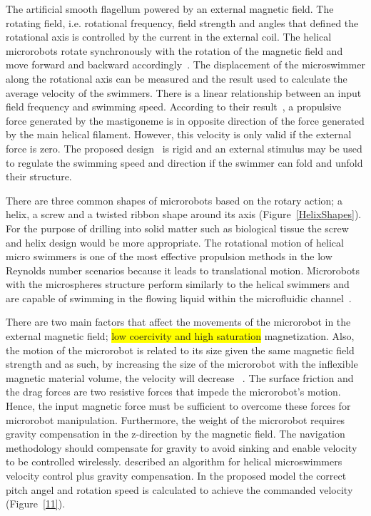 \documentclass[12pt,a4paper,titlepage]{report}
\newcommand{\hilight}[1]{\colorbox{yellow}{#1}}
\begin{document}
The artificial smooth flagellum powered by an external magnetic field. 
 The rotating field, i.e. rotational frequency, field strength and angles that 
defined the rotational axis is controlled by the current in the external coil. The helical microrobots rotate 
synchronously with the rotation of the magnetic field and move forward and backward accordingly~\citep{tottori2013artificial}. 
The displacement of the microswimmer along the rotational axis can be measured and the result 
used to calculate the average velocity of the swimmers. There is a linear relationship between an input 
field frequency and swimming speed. According to their result~\citep{tottori2013artificial}, a propulsive force generated by 
the mastigoneme is in opposite direction of the force generated by the main helical filament. 
However, this velocity is only valid if the external force is zero. The proposed 
design~\citep{tottori2013artificial} is rigid and an external stimulus may be used to regulate the swimming
 speed and direction if the swimmer can fold and unfold their structure. 



There are three common shapes of microrobots 
based on the rotary action; a helix, a screw and a twisted ribbon shape around its
 axis (Figure~\ref{HelixShapes}). For the purpose of drilling into solid matter such as biological tissue the screw and helix 
design would be more appropriate. The rotational motion of helical micro
 swimmers is one of the most effective propulsion methods in the low Reynolds number scenarios 
because it leads to translational motion. Microrobots with the microspheres structure perform similarly 
to the helical swimmers and are capable of swimming in the flowing liquid within the microfluidic channel~\citep{kim2013fabrication}. 



There are two main factors that affect the movements of the microrobot in the external magnetic
 field; \hilight{low coercivity and high saturation} magnetization. Also, the motion of the microrobot is related to 
its size given the same magnetic field strength and as such, by increasing the size of the microrobot with the inflexible magnetic material
 volume, the velocity will decrease ~\citep{kim2013fabrication}. 
The surface friction and the drag forces are two resistive forces that impede the microrobot\rq{}s 
motion. Hence, the input magnetic force must be sufficient to overcome these forces for microrobot 
manipulation. Furthermore, the weight of the microrobot requires gravity compensation in the z-direction by 
the magnetic field. The navigation methodology should compensate for gravity to avoid sinking and enable velocity to be 
controlled wirelessly. \citeauthor{mahoney2011velocity} described an algorithm for helical microswimmers velocity 
control plus gravity compensation. In the proposed model the correct pitch angel and 
rotation speed is calculated to achieve the commanded velocity (Figure~\ref{11}).
\end{document}

